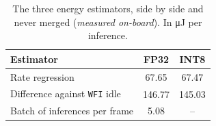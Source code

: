 \begin{table}[htbp]
\centering
\caption{The three energy estimators, side by side and never merged (\emph{measured on-board}). In \si{\micro\joule} per inference.}
\label{tab:annex-energy}
\begin{tabular}{lcc}
\toprule
Estimator & FP32 & INT8 \\
\midrule
Rate regression & \num{67.65} & \num{67.47} \\
Difference against \texttt{WFI} idle & \num{146.77} & \num{145.03} \\
Batch of inferences per frame & \num{5.08} & -- \\
\bottomrule
\end{tabular}
\end{table}
